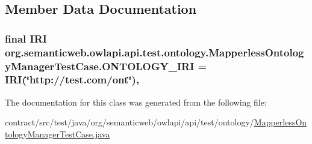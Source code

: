 \subsection{Member Data Documentation}
\hypertarget{classorg_1_1semanticweb_1_1owlapi_1_1api_1_1test_1_1ontology_1_1_mapperless_ontology_manager_test_case_abb270a30c3dcb5b4631672eb264f20db}{
\subsubsection[{O\-N\-T\-O\-L\-O\-G\-Y\-\_\-\-I\-R\-I}]{\setlength{\rightskip}{0pt plus 5cm}final {\bf I\-R\-I} org.\-semanticweb.\-owlapi.\-api.\-test.\-ontology.\-Mapperless\-Ontology\-Manager\-Test\-Case.\-O\-N\-T\-O\-L\-O\-G\-Y\-\_\-\-I\-R\-I = {\bf I\-R\-I}(\char`\"{}http\-://test.\-com/ont\char`\"{})\hspace{0.3cm}{\ttfamily [static]}, {\ttfamily [private]}}}\label{classorg_1_1semanticweb_1_1owlapi_1_1api_1_1test_1_1ontology_1_1_mapperless_ontology_manager_test_case_abb270a30c3dcb5b4631672eb264f20db}


The documentation for this class was generated from the following file\-:\begin{DoxyCompactItemize}
\item 
contract/src/test/java/org/semanticweb/owlapi/api/test/ontology/\hyperlink{_mapperless_ontology_manager_test_case_8java}{Mapperless\-Ontology\-Manager\-Test\-Case.\-java}\end{DoxyCompactItemize}
